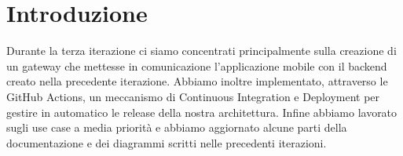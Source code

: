 \section{Introduzione}
Durante la terza iterazione ci siamo concentrati principalmente sulla creazione di un gateway che mettesse in comunicazione l'applicazione mobile con il backend creato nella precedente iterazione.
Abbiamo inoltre implementato, attraverso le GitHub Actions, un meccanismo di Continuous Integration e Deployment per gestire in automatico le release della nostra architettura.
Infine abbiamo lavorato sugli use case a media priorità e abbiamo aggiornato alcune parti della documentazione e dei diagrammi scritti nelle precedenti iterazioni.